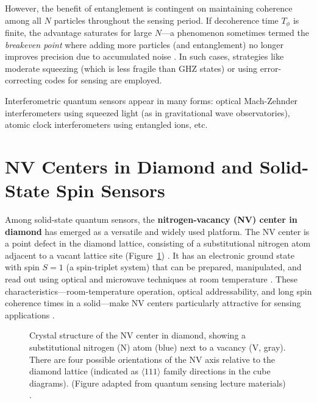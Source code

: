 However, the benefit of entanglement is contingent on maintaining
coherence among all $N$ particles throughout the sensing period. If
decoherence time $T_{\phi}$ is finite, the advantage saturates for
large $N$—a phenomenon sometimes termed the \textit{breakeven point}
where adding more particles (and entanglement) no longer improves
precision due to accumulated noise . In such cases, strategies like
moderate squeezing (which is less fragile than GHZ states) or using
error-correcting codes for sensing are employed.



Interferometric quantum sensors appear in many forms: optical
Mach-Zehnder interferometers using squeezed light (as in gravitational
wave observatories), atomic clock interferometers using entangled
ions, etc.
                               


\section{NV Centers in Diamond and Solid-State Spin Sensors}\label{sec:NV}

Among solid-state quantum sensors, the \textbf{nitrogen-vacancy (NV)
  center in diamond} has emerged as a versatile and widely used
platform. The NV center is a point defect in the diamond lattice,
consisting of a substitutional nitrogen atom adjacent to a vacant
lattice site (Figure~\ref{fig:NV}) . It has an electronic ground state
with spin $S=1$ (a spin-triplet system) that can be prepared,
manipulated, and read out using optical and microwave techniques at
room temperature . These characteristics—room-temperature operation,
optical addressability, and long spin coherence times in a solid—make
NV centers particularly attractive for sensing applications .



\begin{figure}[h]

\centering

\caption{Crystal structure of the NV center in diamond, showing a substitutional nitrogen (N) atom (blue) next to a vacancy (V, gray). There are four possible orientations of the NV axis relative to the diamond lattice (indicated as $\langle 111 \rangle$ family directions in the cube diagrams). (Figure adapted from quantum sensing lecture materials) .}

\label{fig:NV}

\end{figure}



